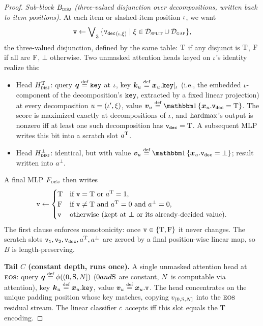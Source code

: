 \documentclass{article}
\begin{document}
\begin{proof}
        
        \emph{Sub-block $B_{\textsc{disj}}$ (three-valued disjunction over decompositions, written back to item positions).}
        At each item or slashed-item position ${{ \iota}}$, we want
        \begin{equation*}
            {\mathtt{v}} \gets \bigvee\nolimits_3 {{\{ {\mathtt{v}_\mathtt{dec}}_{({{ \iota}}, {{\xi}})} \mid {{\xi}} \in {{\mathcal{D}_\textsc{split}}} \cup {{\mathcal{D}_\textsc{gap}}} \}}},
        \end{equation*}
        the three-valued disjunction, defined by the same table: ${\mathbin{\mathrm{T}}}$ if any disjunct is ${\mathbin{\mathrm{T}}}$, ${\mathbin{\mathrm{F}}}$ if all are ${\mathbin{\mathrm{F}}}$, $\bot$ otherwise. Two unmasked attention heads keyed on ${{ \iota}}$'s identity realize this:
        \begin{itemize}[noitemsep,topsep=0pt,leftmargin=15pt,parsep=0pt]
            \item Head $H^{\mathbin{\mathrm{T}}}_{\textsc{disj}}$: query $\vq \defeq \fkeyself$ at ${{ \iota}}$, key $\vk_u \defeq \vx_u.\fkeyself|_{\itm}$ (i.e., the embedded ${{ \iota}}$-component of the decomposition's ${\mathtt{key}}$, extracted by a fixed linear projection) at every decomposition $u = ({{ \iota}}', {{\xi}})$, value $\vv_u \defeq \ind{\vx_u.\fvdec = \true}$. The score is maximized exactly at decompositions of ${{ \iota}}$, and ${{\mathrm{hardmax}}}$'s output is nonzero iff at least one such decomposition has ${\mathtt{v}_\mathtt{dec}} = {\mathbin{\mathrm{T}}}$. A subsequent MLP writes this bit into a scratch slot $a^{\mathbin{\mathrm{T}}}$.
            \item Head $H^\bot_{\textsc{disj}}$: identical, but with value $\vv_u \defeq \ind{\vx_u.\fvdec = \bot}$; result written into $a^\bot$.
        \end{itemize}
        A final MLP $F_{\textsc{disj}}$ then writes
        \begin{equation*}
            {\mathtt{v}} \gets \begin{cases} {\mathbin{\mathrm{T}}} & \text{if } {\mathtt{v}} = {\mathbin{\mathrm{T}}} \text{ or } a^{\mathbin{\mathrm{T}}} = 1, \\ {\mathbin{\mathrm{F}}} & \text{if } {\mathtt{v}} \neq {\mathbin{\mathrm{T}}} \text{ and } a^{\mathbin{\mathrm{T}}} = 0 \text{ and } a^\bot = 0, \\ {\mathtt{v}} & \text{otherwise (kept at $\bot$ or its already-decided value).} \end{cases}
        \end{equation*}
        The first clause enforces monotonicity: once ${\mathtt{v}} \in {{\{ {\mathbin{\mathrm{T}}}, {\mathbin{\mathrm{F}}}\}}}$ it never changes.
        The scratch slots ${\mathtt{v}_\mathtt{1}}, {\mathtt{v}_\mathtt{2}}, {\mathtt{v}_\mathtt{dec}}, a^{\mathbin{\mathrm{T}}}, a^\bot$ are zeroed by a final position-wise linear map, so $B$ is length-preserving.
        
        \textbf{Tail $C$ (constant depth, runs once).}
        A single unmasked attention head at ${{\textsc{eos}}}$:
        query $\vq \defeq \phi((0, \start, \idxn])$ ($0 and {{ \mathrm{S}}}$ are constant, ${{ N}}$ is computable via attention), key $\vk_u \defeq \vx_u.\fkeyself$, value $\vv_u \defeq \vx_u.\fv$.
        The head concentrates on the unique padding position whose key matches, copying $v_{(0, {{ \mathrm{S}}}, {{ N}}]}$ into the ${{\textsc{eos}}}$ residual stream.
        The linear classifier ${{ c}}$ accepts iff this slot equals the ${\mathbin{\mathrm{T}}}$ encoding.
        

\end{proof}
\end{document}
